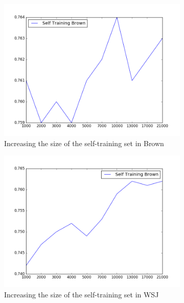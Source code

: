 \documentclass[journal, a4paper]{IEEEtran}
\begin{document}
\begin{figure}
        \begin{subfigure}[b]{0.24\textwidth}
                \includegraphics[width=\linewidth]{selfBrown}
                \caption{Increasing the size of the self-training set in Brown}
                \label{fig:gull2}
        \end{subfigure}%
        \hspace{\fill}
        \begin{subfigure}[b]{0.24\textwidth}
                \includegraphics[width=\linewidth]{selfWSJ}
                \caption{Increasing the size of the self-training set in WSJ}
                \label{fig:mouse}
        \end{subfigure}
        \caption{}\label{plot2}
\vspace{-2mm}
\end{figure}
\end{document}
